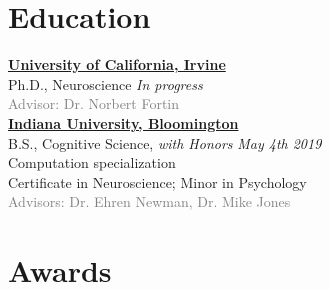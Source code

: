 \documentclass[10pt]{cooperCV2}
\begin{document}
\section{Education} 

\href{http://www.uci.edu/}{\textbf{University of California, Irvine}} \\
Ph.D., Neuroscience \hfill \textit{In progress}\\
\textcolor{grey}{Advisor: Dr. Norbert Fortin}\\




\href{http://www.iu.edu/}{\textbf{Indiana University, Bloomington}} \\
B.S., Cognitive Science, \textit{with Honors} \hfill \textit{May 4th 2019} \\
Computation specialization \\
Certificate in Neuroscience; Minor in Psychology\\
\textcolor{grey}{Advisors: Dr. Ehren Newman, Dr. Mike Jones}




















\section{Awards}
\end{document}
